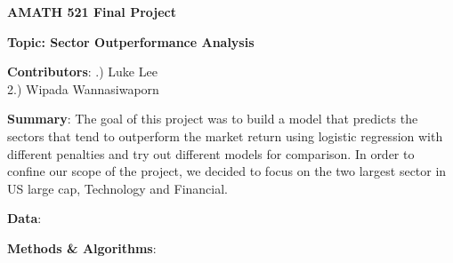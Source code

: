 \documentclass[12pt]{amsart}
\begin{document}
{\bf \Large AMATH 521 Final Project}\\
\begin{center}
{\bf \Large Topic: Sector Outperformance Analysis}\\
\end{center}
\vskip 16pt \noindent
{\textbf{Contributors}: }
\vskip 8pt .) Luke Lee\\
2.) Wipada Wannasiwaporn

\vskip 8pt \noindent
{\textbf{Summary}: }
\vskip 8pt \noindent
The goal of this project was to build a model that predicts the sectors that tend to outperform the market return using logistic regression with different penalties and try out different models for comparison. In order to confine our scope of the project, we decided to focus on the two largest sector in US large cap, Technology and Financial. 

\vskip 8pt \noindent
{\textbf{Data}: }
\vskip 8pt \noindent

\vskip 8pt \noindent
{\textbf{Methods \& Algorithms}: }
\vskip 8pt \noindent
\end{document}
